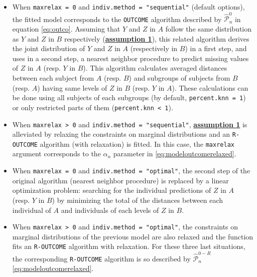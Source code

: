 \begin{itemize}
\tightlist
\item
  When \texttt{maxrelax\ =\ 0} and \texttt{indiv.method\ =\ "sequential"} (default options), the fitted model corresponds to the \texttt{OUTCOME} algorithm described by \(\hat{\mathcal{P}}^0_n\) in equation \eqref{eq:outco}. Assuming that \(Y\) and \(Z\) in \(A\) follow the same distribution as \(Y\) and \(Z\) in \(B\) respectively (\protect\hyperlink{optt}{\textbf{assumption 1}}), this related algorithm derives the joint distribution of \(Y\) and \(Z\) in \(A\) (respectively in \(B\)) in a first step, and uses in a second step, a nearest neighbor procedure to predict missing values of \(Z\) in \(A\) (resp. \(Y\) in \(B\)). This algorithm calculates averaged distances between each subject from \(A\) (resp. \(B\)) and subgroups of subjects from \(B\) (resp. \(A\)) having same levels of \(Z\) in \(B\) (resp. \(Y\) in \(A\)). These calculations can be done using all subjects of each subgroups (by default, \texttt{percent.knn\ =\ 1}) or only restricted parts of them (\texttt{percent.knn\ \textless{}\ 1}).
\item
  When \texttt{maxrelax\ \textgreater{}\ 0} and \texttt{indiv.method\ =\ "sequential"}, \protect\hyperlink{optt}{\textbf{assumption 1}} is alleviated by relaxing the constraints on marginal distributions and an \texttt{R-OUTCOME} algorithm (with relaxation) is fitted. In this case, the \texttt{maxrelax} argument corresponds to the \(\alpha_n\) parameter in \eqref{eq:modeloutcomerelaxed}.
\item
  When \texttt{maxrelax\ =\ 0} and \texttt{indiv.method\ =\ "optimal"}, the second step of the original algorithm (nearest neighbor procedure) is replaced by a linear optimization problem: searching for the individual predictions of \(Z\) in \(A\) (resp. \(Y\) in \(B\)) by minimizing the total of the distances between each individual of \(A\) and individuals of each levels of \(Z\) in \(B\).
\item
  When \texttt{maxrelax\ \textgreater{}\ 0} and \texttt{indiv.method\ =\ "optimal"}, the constraints on marginal distributions of the previous model are also relaxed and the function fits an \texttt{R-OUTCOME} algorithm with relaxation. For these three last situations, the corresponding \texttt{R-OUTCOME} algorithm is so described by \(\hat{\mathcal{P}}^{0-R}_n\) \eqref{eq:modeloutcomerelaxed}.
\end{itemize}

